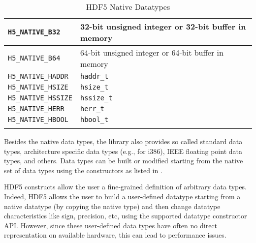 \begin{longtable}{|>{\centering\arraybackslash} m{5.5cm} | >{\centering\arraybackslash} m{6cm} |}
        \small \texttt{H5\_NATIVE\_B32}     & \small 32-bit unsigned integer or 32-bit buffer in memory \\ \hline
        \small \texttt{H5\_NATIVE\_B64}     & \small 64-bit unsigned integer or 64-bit buffer in memory \\ \hline
        \small \texttt{H5\_NATIVE\_HADDR}   & \small \texttt{haddr\_t}                                  \\ \hline
        \small \texttt{H5\_NATIVE\_HSIZE}   & \small \texttt{hsize\_t}                                  \\ \hline
        \small \texttt{H5\_NATIVE\_HSSIZE}  & \small \texttt{hssize\_t}                                 \\ \hline
        \small \texttt{H5\_NATIVE\_HERR}    & \small \texttt{herr\_t}                                   \\ \hline
        \small \texttt{H5\_NATIVE\_HBOOL}   & \small \texttt{hbool\_t}                                  \\ \hline
        \caption{HDF5 Native Datatypes}
        \label{table: hdf5-types}
\end{longtable}

Besides the native data types, the library also provides so called standard data types, architecture specific data types (e.g., for i386), IEEE floating point data types, and others.
Data types can be built or modified starting from the native set of data types using the constructors as listed in .

HDF5 constructs allow the user a fine-grained definition of arbitrary data types.
Indeed, HDF5 allows the user to build a user-defined datatype starting from a native datatype (by copying the native type) and then change datatype characteristics like sign, precision, etc, using the supported datatype constructor API.
However, since these user-defined data types have often no direct representation on available hardware, this can lead to performance issues.

\clearpage

